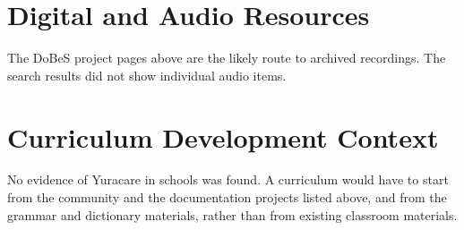 \documentclass[12pt]{article}
\begin{document}
\section{Digital and Audio Resources}
The DoBeS project pages above are the likely route to archived recordings. The search results did not show individual audio items.

\section{Curriculum Development Context}
No evidence of Yuracare in schools was found. A curriculum would have to start from the community and the documentation projects listed above, and from the grammar and dictionary materials, rather than from existing classroom materials.
\end{document}
